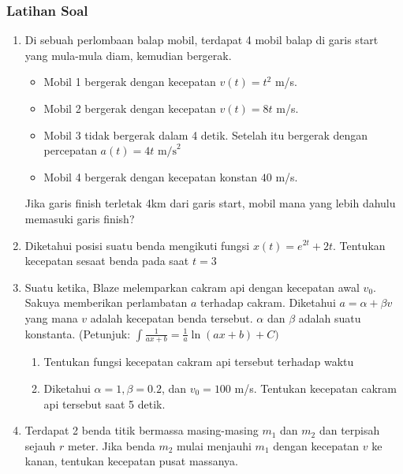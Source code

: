 \documentclass[10pt,aspectratio=54]{beamer}
\begin{document}
\begin{frame}[allowframebreaks]
\frametitle{Latihan Soal}
\begin{enumerate}
 \item Di sebuah perlombaan balap mobil, terdapat 4 mobil balap di garis start yang mula-mula diam, kemudian bergerak.
   \begin{itemize}
     \item Mobil 1 bergerak dengan kecepatan $v(t) = t^2$ m/s. 
     \item Mobil 2 bergerak dengan kecepatan $v(t) = 8t$ m/s.
     \item Mobil 3 tidak bergerak dalam 4 detik. Setelah itu bergerak dengan percepatan $a(t)= 4t\text{ m/s}^2$
     \item Mobil 4 bergerak dengan kecepatan konstan $40$ m/s.
   \end{itemize}
   Jika garis finish terletak 4km dari garis start, mobil mana yang lebih dahulu memasuki garis finish?
   
  \item Diketahui posisi suatu benda mengikuti fungsi $x(t) = e^{2t}+2t$. Tentukan kecepatan sesaat benda pada saat $t=3$
   
   \newpage
  \item Suatu ketika, Blaze melemparkan cakram api dengan kecepatan awal $v_0$. Sakuya memberikan perlambatan $a$ terhadap cakram. Diketahui $a=\alpha + \beta v$ yang mana $v$ adalah kecepatan benda tersebut. $\alpha$ dan $\beta$ adalah suatu konstanta.
    (Petunjuk: $\int{\frac{1}{ax+b}}=\frac{1}{a}\ln(ax+b)+C)$
  \begin{enumerate}
    \item Tentukan fungsi kecepatan cakram api tersebut terhadap waktu
    \item Diketahui $\alpha=1,\beta = 0.2$, dan $v_0=100$ m/s. Tentukan kecepatan cakram api tersebut saat 5 detik. \\
  \end{enumerate}
  \item Terdapat 2 benda titik bermassa masing-masing $m_1$ dan $m_2$ dan terpisah sejauh $r$ meter. Jika benda $m_2$ mulai menjauhi $m_1$ dengan kecepatan $v$ ke kanan, tentukan kecepatan pusat massanya.
\end{enumerate}
\end{frame}
\end{document}
